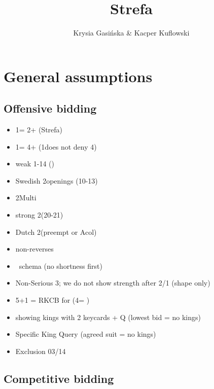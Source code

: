 \documentclass[12pt, a4paper]{report}
\title{\spades\clubs Strefa \xdiams\xhearts}
\author{Krysia Gasińska \& Kacper Kuflowski}
\begin{document}
\maketitle

\tableofcontents

\chapter*{\colorbox{Plum!30}{General assumptions}}
 {

    \section*{\colorbox{blue!30}{Offensive bidding}}
        \begin{itemize}
            \item 1\clubs = 2+ (Strefa)
            \item 1\diams = 4+ (1\clubs does not deny 4\diams)
            \item weak 1-14 ()
            \item Swedish 2\major openings (10-13)
            \item 2\diams Multi
            \item strong 2\nt (20-21)
            \item Dutch 2\clubs (\diams preempt or Acol)
            \item non-\gf reverses
            \item \hsf\ schema (no shortness first)
            \item Non-Serious 3\nt; we do not show strength after 2/1 (shape only)
            \item 5\minor+1 = RKCB for \minor (4\nt = \nat)
            \item showing kings with 2 keycards + Q (lowest bid = no kings)
            \item Specific King Query (agreed suit = no kings)
            \item Exclusion 03/14
        \end{itemize}
    
    \section*{\colorbox{blue!30}{Competitive bidding}}

}
\end{document}
